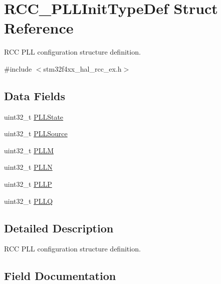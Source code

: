 \hypertarget{struct_r_c_c___p_l_l_init_type_def}{}\section{R\+C\+C\+\_\+\+P\+L\+L\+Init\+Type\+Def Struct Reference}
\label{struct_r_c_c___p_l_l_init_type_def}


R\+CC P\+LL configuration structure definition.  




{\ttfamily \#include $<$stm32f4xx\+\_\+hal\+\_\+rcc\+\_\+ex.\+h$>$}

\subsection*{Data Fields}
\begin{DoxyCompactItemize}
\item 
uint32\+\_\+t \hyperlink{struct_r_c_c___p_l_l_init_type_def_a6cbaf84f6566af15e6e4f97a339d5759}{P\+L\+L\+State}
\item 
uint32\+\_\+t \hyperlink{struct_r_c_c___p_l_l_init_type_def_a72806832a179af8756b9330de7f7c6a8}{P\+L\+L\+Source}
\item 
uint32\+\_\+t \hyperlink{struct_r_c_c___p_l_l_init_type_def_af8ae37696b35fd358c1ec1f6391158a4}{P\+L\+LM}
\item 
uint32\+\_\+t \hyperlink{struct_r_c_c___p_l_l_init_type_def_a2482608639ebfffc51a41135c979369b}{P\+L\+LN}
\item 
uint32\+\_\+t \hyperlink{struct_r_c_c___p_l_l_init_type_def_a4ecedf3ef401fa564aa636824fc3ded0}{P\+L\+LP}
\item 
uint32\+\_\+t \hyperlink{struct_r_c_c___p_l_l_init_type_def_a2b69dfec4b8ab52d649a71d141892691}{P\+L\+LQ}
\end{DoxyCompactItemize}


\subsection{Detailed Description}
R\+CC P\+LL configuration structure definition. 

\subsection{Field Documentation}
\mbox{\label{struct_r_c_c___p_l_l_init_type_def_af8ae37696b35fd358c1ec1f6391158a4}} 
